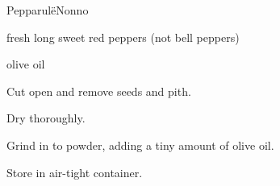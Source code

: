 \begin{recipe}{Pepparul\"e}{Nonno}{}

\begin{ingredients}
\item fresh long sweet red peppers (not bell peppers)
\item olive oil
\end{ingredients}

\begin{directions}
\item Cut open and remove seeds and pith.
\item Dry thoroughly.
\item Grind in to powder, adding a tiny amount of olive oil.
\item Store in air-tight container.
\end{directions}

\end{recipe}
